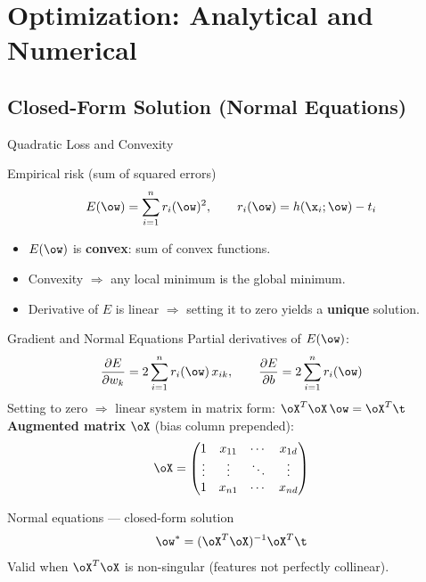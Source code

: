 \section{Optimization: Analytical and Numerical}

\subsection{Closed-Form Solution (Normal Equations)}

\begin{frame}{Quadratic Loss and Convexity}
  \begin{block}{Empirical risk (sum of squared errors)}
    \[
      E(\ow) = \sum_{i=1}^n r_i(\ow)^2, \qquad r_i(\ow) = h(\x_i;\ow) - t_i
    \]
  \end{block}
  \begin{itemize}
    \item $E(\ow)$ is \textbf{convex}: sum of convex functions.
    \item Convexity $\Rightarrow$ any local minimum is the \alert{global minimum}.
    \item Derivative of $E$ is linear $\Rightarrow$ setting it to zero yields a \textbf{unique} solution.
  \end{itemize}
\end{frame}

\begin{frame}{Gradient and Normal Equations}
  Partial derivatives of $E(\ow)$:
  \[
    \frac{\partial E}{\partial w_k} = 2\sum_{i=1}^n r_i(\ow)\,x_{ik}, \qquad
    \frac{\partial E}{\partial b} = 2\sum_{i=1}^n r_i(\ow)
  \]
  Setting to zero $\Rightarrow$ linear system in matrix form: $\oX^T\oX\,\ow = \oX^T\t$\\[4pt]
  \textbf{Augmented matrix} $\oX$ (bias column prepended):
  \[
    \oX = \begin{pmatrix}1&x_{11}&\cdots&x_{1d}\\\vdots&\vdots&\ddots&\vdots\\1&x_{n1}&\cdots&x_{nd}\end{pmatrix}
  \]
  \begin{alertblock}{Normal equations — closed-form solution}
    \[
      \ow^* = (\oX^T\oX)^{-1}\oX^T\t
    \]
    Valid when $\oX^T\oX$ is non-singular (features not perfectly collinear).
  \end{alertblock}
\end{frame}


